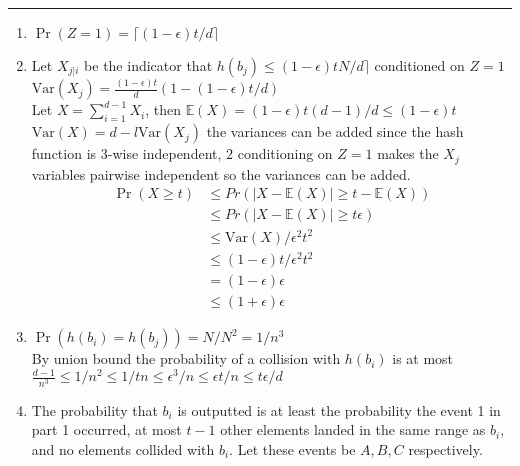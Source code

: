 \documentclass[11pt]{article}
\begin{document}




\begin{quote}

\end{quote}
\hrule


\begin{solution}
\item
\begin{enumerate}
    \item  $\Pr(Z = 1) = \lceil (1 - \epsilon)t / d \rceil$ 
    \item Let $X_{j | i}$ be the indicator that $h(b_j) \leq (1 - \epsilon)tN / d \rceil$ conditioned on $Z = 1$ \\
    $\mathrm{Var}(X_j) = \frac{(1 - \epsilon)t}{d}(1 - (1 -  \epsilon)t / d)$ \\
    Let $X = \sum_{i= 1}^{d-1} X_i$, then $\mathbb{E}(X) = (1 - \epsilon)t(d-1)/d \leq (1 - \epsilon)t$ $\mathrm{Var}(X) = d - l \mathrm{Var}(X_j)$ the variances can be added since the hash function is $3$-wise independent, $2$ conditioning on $Z = 1$ makes the $X_j$ variables pairwise independent so the variances can be added. \\
    \begin{align*}
        \Pr(X \geq t) &\leq Pr(|X - \mathbb{E}(X)| \geq t - \mathbb{E}(X)) \\
        &\leq Pr(|X - \mathbb{E}(X)| \geq t\epsilon)\\
        & \leq \mathrm{Var}(X)/\epsilon^2 t^2 \\
        & \leq (1 - \epsilon)t/\epsilon^2 t^2 \\
        &= (1 - \epsilon)\epsilon \\
        &\leq (1 + \epsilon)\epsilon
    \end{align*}
    \item $\Pr(h(b_i) = h(b_j)) = N/N^2 = 1/n^3$ \\
    By union bound the probability of a collision with $h(b_i)$ is at most $\frac{d-1}{n^3} \leq 1/n^2 \leq 1/tn \leq \epsilon^3/n \leq \epsilon t/n \leq t\epsilon/d$ 
    \item The probability that $b_i$ is outputted is at least the probability the event 1 in part 1 occurred, at most $t-1$ other elements landed in the same range as $b_i$, and no elements collided with $b_i$. Let these events be $A, B,C$ respectively. \\

\end{enumerate}
\end{solution}
\end{document}

